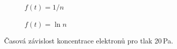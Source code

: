 \documentclass[a4paper,12pt]{article}
\begin{document}
\begin{figure}[h]
	\centering
	\begin{subfigure}[b]{.49\linewidth}
		\centering
		\caption{$f(t) = 1/n$}
	\end{subfigure}
	\begin{subfigure}[b]{.49\linewidth}
		\centering
		\caption{$f(t) = \ln n$}
	\end{subfigure}
	\caption{Časová závislost koncentrace elektronů pro tlak 20\,Pa.}
	\label{g:20Pa}
\end{figure}
\end{document}

